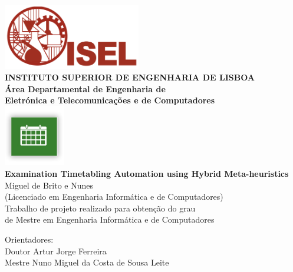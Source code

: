\begin{titlepage}
	\thispagestyle{empty}
	\begin{center}
		\includegraphics[width=0.45\textwidth,natwidth=720,natheight=434]{./images/isellogo2.png} \\[0.5cm]
		{\Large \textbf{INSTITUTO SUPERIOR DE ENGENHARIA DE LISBOA}} \\[0.5cm]
		{\Large \textbf{Área Departamental de Engenharia de \\Eletrónica e Telecomunica\c cões e de Computadores}} \\[0.8cm]		
		\includegraphics[width=0.2\textwidth,natwidth=300,natheight=300]{./images/timetable.jpg} \\[0.8cm]
		\fontsize{18pt}{10pt}\selectfont
		{\textbf{Examination Timetabling Automation using Hybrid Meta-heuristics}} \\[0.8cm]
		\fontsize{16pt}{10pt}\selectfont
		Miguel de Brito e Nunes\\[0.2cm]
		\fontsize{14pt}{10pt}\selectfont
		(Licenciado em Engenharia Informática e de Computadores)\\[0.8cm]
		\fontsize{12pt}{10pt}\selectfont
		{Trabalho de projeto realizado para obten\c cão do grau\\de Mestre em Engenharia Informática e de Computadores} \\[0.8cm]
		\begin{tabbing}
		   \fontsize{12pt}{10pt}\selectfont
		   Orientadores: \\
		   \fontsize{11pt}{10pt}\selectfont
		   \hspace{1.1cm}Doutor Artur Jorge Ferreira \\
		   \fontsize{11pt}{10pt}\selectfont
		   \hspace{1.1cm}Mestre Nuno Miguel da Costa de Sousa Leite \\

\end{tabbing}
\end{center}
\end{titlepage}
